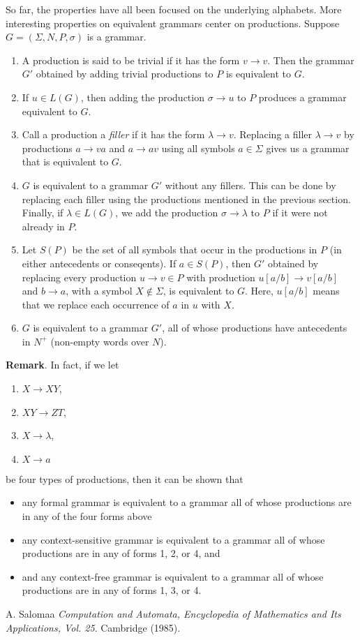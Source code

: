 \documentclass[12pt]{article}
\begin{document}
So far, the properties have all been focused on the underlying alphabets.  More interesting properties on equivalent grammars center on productions.  Suppose $G=(\Sigma,N,P,\sigma)$ is a grammar.
\begin{enumerate}
\item
A production is said to be trivial if it has the form $v\to v$.  Then the grammar $G'$ obtained by adding trivial productions to $P$ is equivalent to $G$.
\item
If $u\in L(G)$, then adding the production $\sigma\to u$ to $P$ produces a grammar equivalent to $G$.
\item
Call a production a \emph{filler} if it has the form $\lambda \to v$.  Replacing a filler $\lambda \to v$ by productions $a\to va$ and $a\to av$ using all symbols $a\in \Sigma$ gives us a grammar that is equivalent to $G$.
\item
$G$ is equivalent to a grammar $G'$ without any fillers.  This can be done by replacing each filler using the productions mentioned in the previous section.  Finally, if $\lambda\in L(G)$, we add the production $\sigma \to \lambda$ to $P$ if it were not already in $P$.
\item
Let $S(P)$ be the set of all symbols that occur in the productions in $P$ (in either antecedents or conseqents).  If $a\in S(P)$, then $G'$ obtained by replacing every production $u\to v \in P$ with production $u[a/b]\to v[a/b]$ and $b\to a$, with a symbol $X\notin \Sigma$, is equivalent to $G$.  Here, $u[a/b]$ means that we replace each occurrence of $a$ in $u$ with $X$.
\item
$G$ is equivalent to a grammar $G'$, all of whose productions have antecedents in $N^+$ (non-empty words over $N$).
\end{enumerate}

\textbf{Remark}.  In fact, if we let 
\begin{enumerate}
\item $X\to XY$,
\item $XY\to ZT$,
\item $X\to \lambda$,
\item $X\to a$
\end{enumerate}
be four types of productions, then it can be shown that 
\begin{itemize}
\item any formal grammar is equivalent to a grammar all of whose productions are in any of the four forms above
\item any context-sensitive grammar is equivalent to a grammar all of whose productions are in any of forms 1, 2, or 4, and
\item and any context-free grammar is equivalent to a grammar all of whose productions are in any of forms 1, 3, or 4.
\end{itemize}

\begin{thebibliography}{9}
 A. Salomaa {\em Computation and Automata, Encyclopedia of Mathematics and Its Applications, Vol. 25}. Cambridge (1985).
\end{thebibliography}
\end{document}
